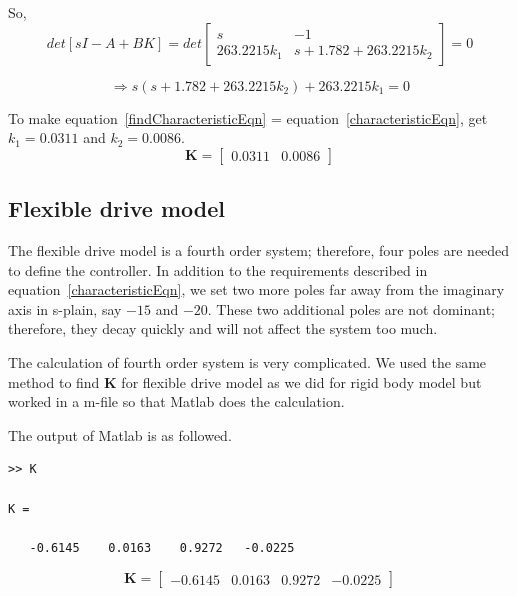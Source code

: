\documentclass[a4paper, 12pt]{article}
\begin{document}
So, 
\begin{equation}
det[sI - A+BK] = det
\begin{bmatrix}
s	&	-1	\\
263.2215k_1	&	s+1.782+263.2215k_2
\end{bmatrix} =0
\end{equation}

\begin{equation}\label{findCharacteristicEqn}
\Longrightarrow s(s+1.782+263.2215k_2) + 263.2215k_1 = 0 
\end{equation}

To make equation~\ref{findCharacteristicEqn} = equation~\ref{characteristicEqn}, get $k_1 = 0.0311$ and $k_2 = 0.0086$. 
\begin{equation}\label{K4rigid}
\mathbf{K} = 
\begin{bmatrix}
0.0311	&	0.0086
\end{bmatrix}
\end{equation}

\subsection{Flexible drive model}
\hspace{2.5ex}
The flexible drive model is a fourth order system; therefore, four poles are needed to define the controller. In addition to the requirements described in equation~\ref{characteristicEqn}, we set two more poles far away from the imaginary axis in s-plain, say $-15$ and $-20$. These two additional poles are not dominant; therefore, they decay quickly and will not affect the system too much. 

The calculation of fourth order system is very complicated. We used the same method to find $\mathbf{K}$ for flexible drive model as we did for rigid body model but worked in a m-file so that Matlab does the calculation.

The output of Matlab is as followed.

\begin{verbatim}
>> K

K =

   -0.6145    0.0163    0.9272   -0.0225
\end{verbatim}

\begin{equation}\label{K4flexible}
\mathbf{K} = 
\begin{bmatrix}
-0.6145	&	0.0163	&	0.9272	&	-0.0225
\end{bmatrix}
\end{equation}
\end{document}
